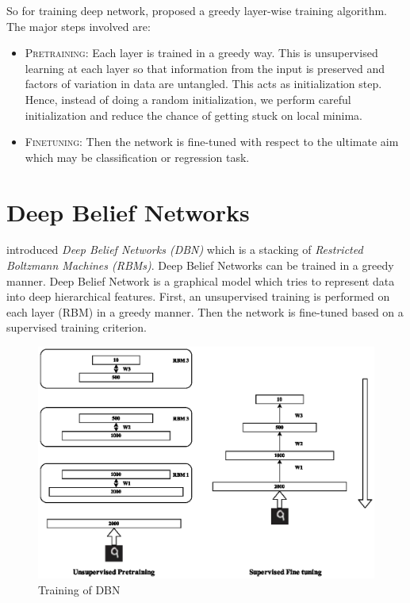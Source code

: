 So for training deep network, \citet{hinton2006reducing} proposed a greedy layer-wise training algorithm. The major steps involved are:
\begin{itemize}
\item \textsc{Pretraining}: Each layer is trained in a greedy way. This is unsupervised learning at each layer so that information from the input is preserved and factors of variation in data are untangled. This acts as initialization step. Hence, instead of doing a random initialization, we perform careful initialization and reduce the chance of getting stuck on local minima.
\item \textsc{Finetuning}: Then the network is fine-tuned with respect to the ultimate aim which may be classification or regression task.
\end{itemize}

\section{Deep Belief Networks}
\citet{hinton2006reducing} introduced \emph{Deep Belief Networks (DBN)} which is a stacking of \emph{Restricted Boltzmann Machines (RBMs)}. Deep Belief Networks can be trained in a greedy manner\cite{hinton2006reducing}. Deep Belief Network is a graphical model which tries to represent data into deep hierarchical features. First, an unsupervised training is performed on each layer (RBM) in a greedy manner. Then the network is fine-tuned based on a supervised training criterion.\\
\begin{figure}[!ht]
\centering
\includegraphics[width=1\textwidth]{./imgs/RBM_Train.eps} 
\caption{Training of DBN}
\end{figure}

